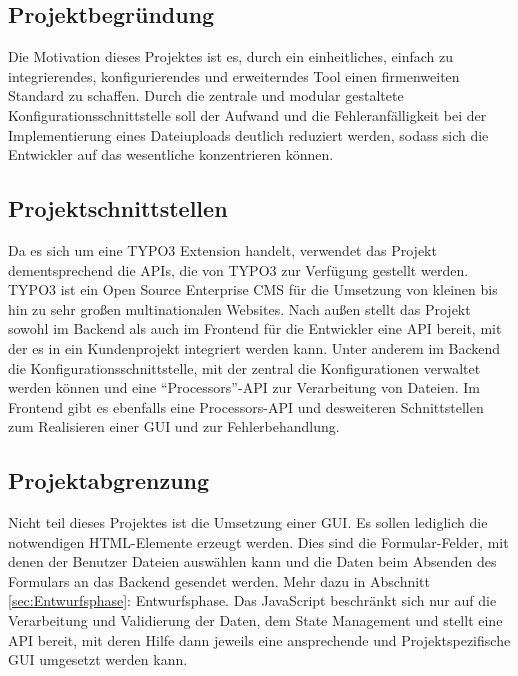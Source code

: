 \subsection{Projektbegründung} 
\label{sec:Projektbegruendung}
Die Motivation dieses Projektes ist es, durch ein einheitliches, einfach zu integrierendes, konfigurierendes und erweiterndes Tool einen firmenweiten Standard zu schaffen. Durch die zentrale und modular gestaltete Konfigurationsschnittstelle soll der Aufwand und die Fehleranfälligkeit bei der Implementierung eines Dateiuploads deutlich reduziert werden, sodass sich die Entwickler auf das wesentliche konzentrieren können.


\subsection{Projektschnittstellen} 
\label{sec:Projektschnittstellen}
Da es sich um eine TYPO3 Extension handelt, verwendet das Projekt dementsprechend die APIs, die von TYPO3 zur Verfügung gestellt werden. TYPO3 ist ein Open Source Enterprise \ac{CMS} für die Umsetzung von kleinen bis hin zu sehr großen multinationalen Websites. Nach außen stellt das Projekt sowohl im Backend als auch im Frontend für die Entwickler eine API bereit, mit der es in ein Kundenprojekt integriert werden kann. Unter anderem im Backend die Konfigurationsschnittstelle, mit der zentral die Konfigurationen verwaltet werden können und eine ``Processors''-API zur Verarbeitung von Dateien. Im Frontend gibt es ebenfalls eine Processors-API und desweiteren Schnittstellen zum Realisieren einer GUI und zur Fehlerbehandlung.


\subsection{Projektabgrenzung} 
\label{sec:Projektabgrenzung}
Nicht teil dieses Projektes ist die Umsetzung einer GUI. Es sollen lediglich die notwendigen HTML-Elemente erzeugt werden. Dies sind die Formular-Felder, mit denen der Benutzer Dateien auswählen kann und die Daten beim Absenden des Formulars an das Backend gesendet werden. Mehr dazu in Abschnitt \ref{sec:Entwurfsphase}: Entwurfsphase. Das JavaScript beschränkt sich nur auf die Verarbeitung und Validierung der Daten, dem State Management und stellt eine API bereit, mit deren Hilfe dann jeweils eine ansprechende und Projektspezifische GUI umgesetzt werden kann.
